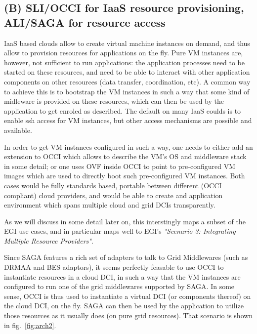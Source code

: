 \documentclass[10pt,conference,final,letterpaper,twoside,twocolumn,]{IEEEtran}
\newcommand{\I}[1]{\textit{#1}}
\begin{document}
 \subsection{(B) SLI/OCCI for IaaS resource provisioning, ALI/SAGA 
 for resource access}

 IaaS based clouds allow to create virtual machine instances on
 demand, and thus allow to provision resources for applications on the
 fly.  Pure VM instances are, however, not sufficient to run
 applications: the application processes need to be started on these resources,
 and need to be able to interact with other application components on
 other resources (data transfer, coordination, etc).  A common way to
 achieve this is to bootstrap the VM instances in such a way that some
 kind of midleware is provided on these resources, which can then be
 used by the application to get enroled as described.  The default on
 many IaaS coulds is to enable ssh access for VM instances, but other
 access mechanisms are possible and available.

 In order to get VM instances configured in such a way, one needs to
 either add an extension to OCCI which allows to describe the VM's OS
 and middleware stack in some detail; or one uses OVF inside OCCI to
 point to pre-configured VM images which are used to directly boot
 such pre-configured VM instances.  Both cases would be fully
 standards based, portable between different (OCCI compliant) cloud
 providers, and would be able to create and application environment
 which spans multiple cloud and grid DCIs transparently.

 As we will discuss in some detail later on, this interstingly maps a
 subset of the EGI use cases, and in particular maps well to EGI's
 \I{"Scenario 3: Integrating Multiple Resource Providers"}.
 
 Since SAGA features a rich set of adapters to talk to Grid
 Middlewares (such as DRMAA and BES adaptors), it seems perfectly
 feasable to use OCCI to instantiate resources in a cloud DCI, in such
 a way that the VM instances are configured to run one of the grid
 middlewares supported by SAGA.  In some sense, OCCI is thus used to
 instantiate a virtual DCI (or components thereof) on the cloud DCI,
 on the fly.  SAGA can then be used by the application to utilize
 those resources as it usually does (on pure grid resources).  That
 scenario is shown in fig.~\ref{fig:arch2}.
\end{document}
